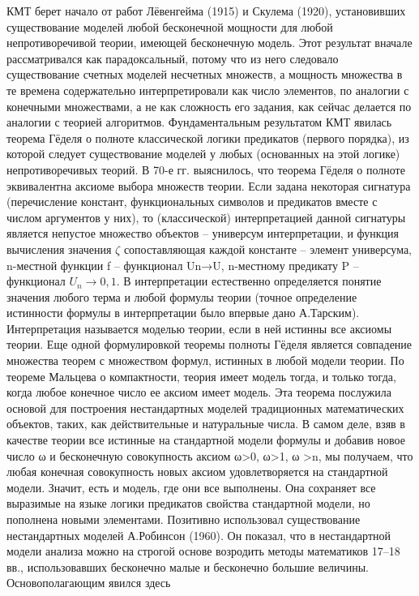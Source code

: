 \documentclass[12pt, a4paper]{article}
\begin{document}
КМТ берет начало от работ Лёвенгейма (1915) и Скулема (1920), установивших существование
моделей любой бесконечной мощности для любой непротиворечивой теории, имеющей бесконечную
модель. Этот результат вначале рассматривался как парадоксальный, потому что из него следовало
существование счетных моделей несчетных множеств, а мощность множества в те времена
содержательно интерпретировали как число элементов, по аналогии с конечными множествами, а не
как сложность его задания, как сейчас делается по аналогии с теорией алгоритмов. Фундаментальным
результатом КМТ явилась теорема Гёделя о полноте классической логики предикатов (первого
порядка), из которой следует существование моделей у любых (основанных на этой логике)
непротиворечивых теорий. В 70-е гг. выяснилось, что теорема Гёделя о полноте эквивалентна аксиоме
выбора множеств теории.
Если задана некоторая сигнатура (перечисление констант, функциональных символов и предикатов
вместе с числом аргументов у них), то (классической) интерпретацией данной сигнатуры является
непустое множество объектов – универсум интерпретации, и функция вычисления значения $\zeta$
сопоставляющая каждой константе – элемент универсума, n-местной функции f – функционал Un→U,
n-местному предикату Ρ – функционал $U_n \rightarrow {0,1}$. В интерпретации естественно определяется
понятие значения любого терма и любой формулы теории (точное определение истинности формулы в
интерпретации было впервые дано А.Тарским). Интерпретация называется моделью теории, если в ней
истинны все аксиомы теории. Еще одной формулировкой теоремы полноты Гёделя является
совпадение множества теорем с множеством формул, истинных в любой модели теории.
По теореме Мальцева о компактности, теория имеет модель тогда, и только тогда, когда любое
конечное число ее аксиом имеет модель. Эта теорема послужила основой для построения
нестандартных моделей традиционных математических объектов, таких, как действительные и
натуральные числа.
В самом деле, взяв в качестве теории все истинные на стандартной модели формулы и добавив новое
число ω и бесконечную совокупность аксиом ω>0, ω>1, ω >n, мы получаем, что любая конечная
совокупность новых аксиом удовлетворяется на стандартной модели. Значит, есть и модель, где они
все выполнены. Она сохраняет все выразимые на языке логики предикатов свойства стандартной
модели, но пополнена новыми элементами.
Позитивно использовал существование нестандартных моделей А.Робинсон (1960). Он показал, что в
нестандартной модели анализа можно на строгой основе возродить методы математиков 17–18 вв.,
использовавших бесконечно малые и бесконечно большие величины. Основополагающим явился здесь
\end{document}
